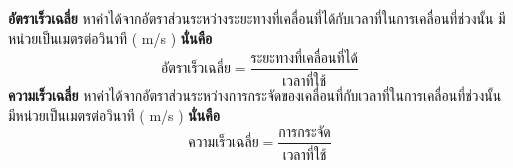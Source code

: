	\textbf{อัตราเร็วเฉลี่ย} หาค่าได้จากอัตราส่วนระหว่างระยะทางที่เคลื่อนที่ได้กับเวลาที่ในการเคลื่อนที่ช่วงนั้น  มีหน่วยเป็นเมตรต่อวินาที ( m/s ) \textbf{นั่นคือ}
				$$        \text{อัตราเร็วเฉลี่ย}  =  \frac{\text{ระยะทางที่เคลื่อนที่ได้}}{\text{เวลาที่ใช้}} $$ 
	\textbf{ความเร็วเฉลี่ย} หาค่าได้จากอัตราส่วนระหว่างการกระจัดของเคลื่อนที่กับเวลาที่ในการเคลื่อนที่ช่วงนั้น  มีหน่วยเป็นเมตรต่อวินาที ( m/s ) \textbf{นั่นคือ}
				$$        \text{ความเร็วเฉลี่ย}  =  \frac{\text{การกระจัด}}{\text{เวลาที่ใช้}} $$
